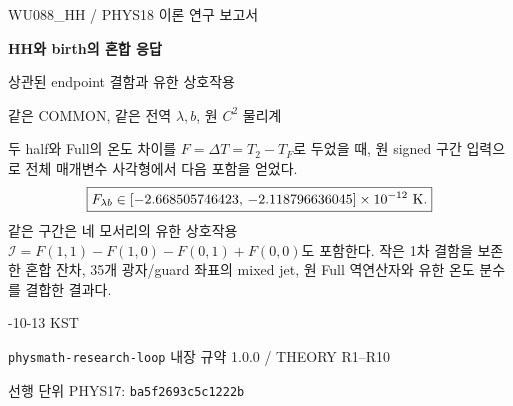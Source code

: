 

\begin{titlepage}
\centering
\vspace*{16mm}
{\Large\sffamily WU088\_HH / PHYS18 이론 연구 보고서\par}
\vspace{9mm}
{\huge\sffamily\bfseries HH와 birth의 혼합 응답\par}
\vspace{4mm}
{\LARGE\sffamily 상관된 endpoint 결함과 유한 상호작용\par}
\vspace{12mm}
{\large 같은 COMMON, 같은 전역 $\lambda,b$, 원 $C^2$ 물리계\par}
\vspace{10mm}
\begin{minipage}{0.88\textwidth}
\setlength{\parindent}{0pt}
두 half와 Full의 온도 차이를 $F=\Delta T=T_2-T_F$로 두었을 때,
원 signed 구간 입력으로 전체 매개변수 사각형에서 다음 포함을 얻었다.
\[
\boxed{F_{\lambda b}\in
[-2.668505746423,\,-2.118796636045]\times10^{-12}\ {\rm K}.}
\]
같은 구간은 네 모서리의 유한 상호작용
$\mathcal I=F(1,1)-F(1,0)-F(0,1)+F(0,0)$도 포함한다.
작은 1차 결함을 보존한 혼합 잔차, 35개 광자/guard 좌표의 mixed jet,
원 Full 역연산자와 유한 온도 분수를 결합한 결과다.
\end{minipage}
\vfill
{\large{}-10-13 KST\par}
\vspace{3mm}
{\small \texttt{physmath-research-loop} 내장 규약 1.0.0 / THEORY R1--R10\par}
\vspace{3mm}
{\small 선행 단위 PHYS17: \texttt{ba5f2693c5c1222b}\par}
\end{titlepage}
\setcounter{tocdepth}{2}
\tableofcontents
\clearpage







